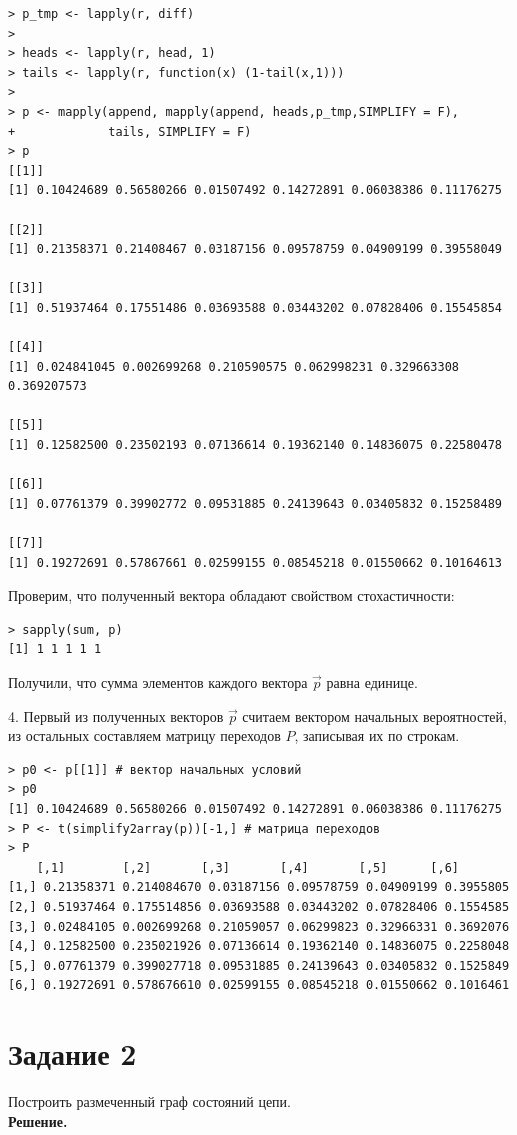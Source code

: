 \documentclass[14pt,a4paper]{scrartcl}
\begin{document}
\begin{verbatim}
> p_tmp <- lapply(r, diff)
> 
> heads <- lapply(r, head, 1)
> tails <- lapply(r, function(x) (1-tail(x,1)))
> 
> p <- mapply(append, mapply(append, heads,p_tmp,SIMPLIFY = F),
+             tails, SIMPLIFY = F)
> p
[[1]]
[1] 0.10424689 0.56580266 0.01507492 0.14272891 0.06038386 0.11176275

[[2]]
[1] 0.21358371 0.21408467 0.03187156 0.09578759 0.04909199 0.39558049

[[3]]
[1] 0.51937464 0.17551486 0.03693588 0.03443202 0.07828406 0.15545854

[[4]]
[1] 0.024841045 0.002699268 0.210590575 0.062998231 0.329663308 0.369207573

[[5]]
[1] 0.12582500 0.23502193 0.07136614 0.19362140 0.14836075 0.22580478

[[6]]
[1] 0.07761379 0.39902772 0.09531885 0.24139643 0.03405832 0.15258489

[[7]]
[1] 0.19272691 0.57867661 0.02599155 0.08545218 0.01550662 0.10164613
\end{verbatim}

Проверим, что полученный вектора обладают свойством стохастичности:

\begin{verbatim}
> sapply(sum, p)
[1] 1 1 1 1 1
\end{verbatim}

Получили, что сумма элементов каждого вектора $\vec{p}$ равна единице.

4. Первый из полученных векторов $\vec{p}$ считаем вектором начальных вероятностей, из остальных составляем матрицу переходов $P$, записывая их по строкам.

\begin{verbatim}
> p0 <- p[[1]] # вектор начальных условий
> p0
[1] 0.10424689 0.56580266 0.01507492 0.14272891 0.06038386 0.11176275
> P <- t(simplify2array(p))[-1,] # матрица переходов
> P
	[,1]        [,2]       [,3]       [,4]       [,5]      [,6]
[1,] 0.21358371 0.214084670 0.03187156 0.09578759 0.04909199 0.3955805
[2,] 0.51937464 0.175514856 0.03693588 0.03443202 0.07828406 0.1554585
[3,] 0.02484105 0.002699268 0.21059057 0.06299823 0.32966331 0.3692076
[4,] 0.12582500 0.235021926 0.07136614 0.19362140 0.14836075 0.2258048
[5,] 0.07761379 0.399027718 0.09531885 0.24139643 0.03405832 0.1525849
[6,] 0.19272691 0.578676610 0.02599155 0.08545218 0.01550662 0.1016461
\end{verbatim}

\pagebreak
\section*{Задание 2}
Построить размеченный граф состояний цепи.\\
\textbf{Решение.}\\
\end{document}
